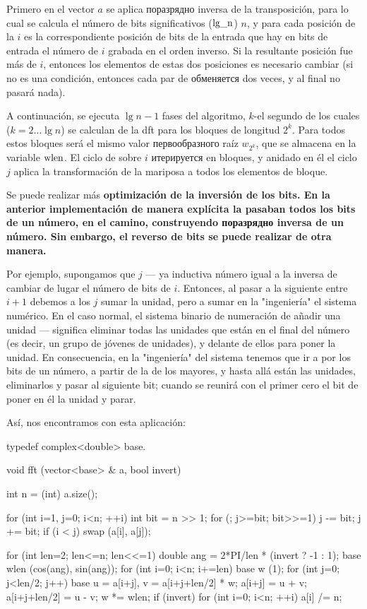 Primero en el vector $a$ se aplica поразрядно inversa de la transposición, para lo cual se calcula el número de bits significativos ($\rm lg\_n$) $n$, y para cada posición de la $i$ es la correspondiente posición de bits de la entrada que hay en bits de entrada el número de $i$ grabada en el orden inverso. Si la resultante posición fue más de $i$, entonces los elementos de estas dos posiciones es necesario cambiar (si no es una condición, entonces cada par de обменяется dos veces, y al final no pasará nada).

A continuación, se ejecuta $\lg n - 1$ fases del algoritmo, $k$-el segundo de los cuales ($k=2 \ldots \lg n$) se calculan de la dft para los bloques de longitud $2^k$. Para todos estos bloques será el mismo valor первообразного raíz $w_{2^k}$, que se almacena en la variable $\rm wlen$. El ciclo de sobre $i$ итерируется en bloques, y anidado en él el ciclo $j$ aplica la transformación de la mariposa a todos los elementos de bloque.

Se puede realizar más \bf{optimización de la inversión de los bits}. En la anterior implementación de manera explícita la pasaban todos los bits de un número, en el camino, construyendo поразрядно inversa de un número. Sin embargo, el reverso de bits se puede realizar de otra manera.

Por ejemplo, supongamos que $j$ --- ya inductiva número igual a la inversa de cambiar de lugar el número de bits de $i$. Entonces, al pasar a la siguiente entre $i+1$ debemos a los $j$ sumar la unidad, pero a sumar en la "ingeniería" el sistema numérico. En el caso normal, el sistema binario de numeración de añadir una unidad --- significa eliminar todas las unidades que están en el final del número (es decir, un grupo de jóvenes de unidades), y delante de ellos para poner la unidad. En consecuencia, en la "ingeniería" del sistema tenemos que ir a por los bits de un número, a partir de la de los mayores, y hasta allá están las unidades, eliminarlos y pasar al siguiente bit; cuando se reunirá con el primer cero el bit de poner en él la unidad y parar.

Así, nos encontramos con esta aplicación:

\code
typedef complex<double> base.

void fft (vector<base> & a, bool invert) {
int n = (int) a.size();

for (int i=1, j=0; i<n; ++i) {
int bit = n >> 1;
for (; j>=bit; bit>>=1)
j -= bit;
j += bit;
if (i < j)
swap (a[i], a[j]);
}

for (int len=2; len<=n; len<<=1) {
double ang = 2*PI/len * (invert ? -1 : 1);
base wlen (cos(ang), sin(ang));
for (int i=0; i<n; i+=len) {
base w (1);
for (int j=0; j<len/2; j++) {
base u = a[i+j], v = a[i+j+len/2] * w;
a[i+j] = u + v;
a[i+j+len/2] = u - v;
w *= wlen;
}
}
}
if (invert)
for (int i=0; i<n; ++i)
a[i] /= n;
}
\endcode


